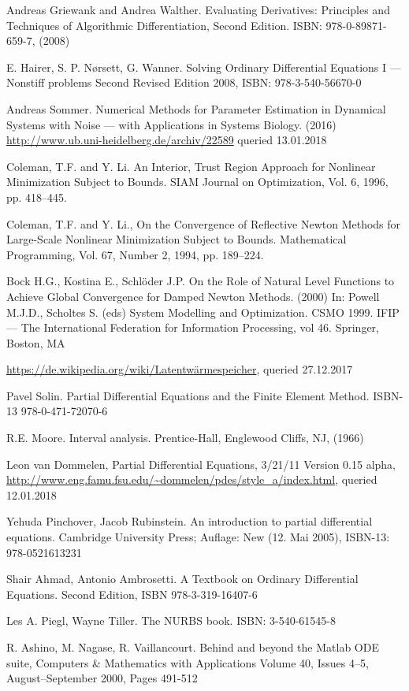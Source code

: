 \documentclass{scrartcl}[12pt, halfparskip]
\numberwithin{equation}{section}
\numberwithin{figure}{section}
\numberwithin{table}{section}
\begin{document}
\begin{thebibliography}{9}
	Andreas Griewank and Andrea Walther.
	Evaluating Derivatives: Principles and Techniques of Algorithmic Differentiation, Second Edition.
	ISBN: 978-0-89871-659-7, 
	(2008)

	E. Hairer, S. P. Nørsett, G. Wanner.
	Solving Ordinary Differential Equations I --- Nonstiff problems
	Second Revised Edition
	2008, ISBN: 978-3-540-56670-0
	
	Andreas Sommer.
	Numerical Methods for Parameter Estimation in Dynamical Systems with Noise --- with Applications in Systems Biology. (2016)
	\url{http://www.ub.uni-heidelberg.de/archiv/22589} queried 13.01.2018
	
	Coleman, T.F. and Y. Li.
	An Interior, Trust Region Approach for Nonlinear Minimization Subject to Bounds.
	SIAM Journal on Optimization, Vol. 6, 1996, pp. 418–445.
  
	Coleman, T.F. and Y. Li., 
	On the Convergence of Reflective Newton Methods for Large-Scale Nonlinear Minimization Subject to Bounds.
	Mathematical Programming, Vol. 67, Number 2, 1994, pp. 189–224.
	
	Bock H.G., Kostina E., Schlöder J.P. 
	On the Role of Natural Level Functions to Achieve Global Convergence for Damped Newton Methods. (2000)
	In: Powell M.J.D., Scholtes S. (eds) System Modelling and Optimization. CSMO 1999. IFIP — The International Federation for Information Processing, vol 46. Springer, Boston, MA
	
	\url{https://de.wikipedia.org/wiki/Latentwärmespeicher}, queried 27.12.2017
	
	Pavel Solin.
	Partial Differential Equations and the Finite Element Method.
	ISBN-13 978-0-471-72070-6
	
	R.E. Moore. 
	Interval analysis. 
	Prentice-Hall, Englewood Cliffs, NJ, 
	(1966)
  
	Leon van Dommelen, 
	Partial Differential Equations, 3/21/11 Version 0.15 alpha,
	\url{http://www.eng.famu.fsu.edu/~dommelen/pdes/style_a/index.html}, queried 12.01.2018
	
	Yehuda Pinchover, Jacob Rubinstein.
	An introduction to partial differential equations.
	Cambridge University Press; Auflage: New (12. Mai 2005), 
	ISBN-13: 978-0521613231
	
	Shair Ahmad, Antonio Ambrosetti.
	A Textbook on Ordinary Differential Equations. Second Edition, 
	ISBN 978-3-319-16407-6
	
	Les A. Piegl, Wayne Tiller.
	The NURBS book.
	ISBN: 3-540-61545-8 
	
	R. Ashino, M. Nagase, R. Vaillancourt.
	Behind and beyond the Matlab ODE suite,
	Computers \& Mathematics with Applications Volume 40, Issues 4–5, August–September 2000, Pages 491-512
  
\end{thebibliography}
\end{document}
